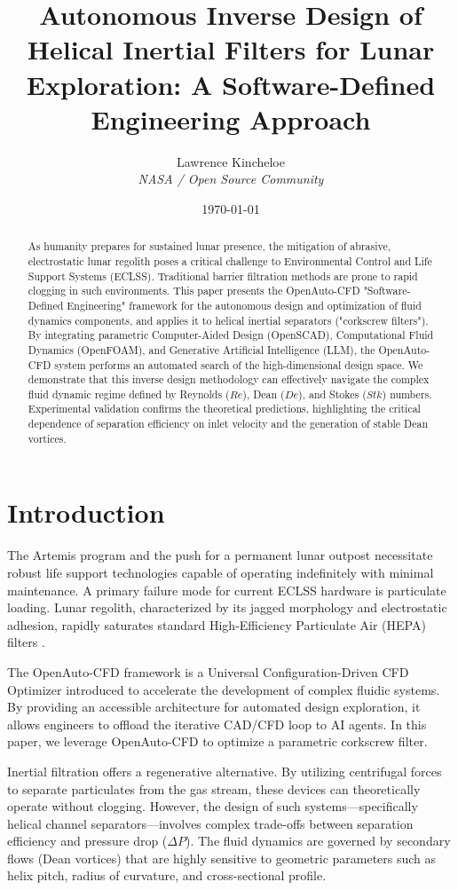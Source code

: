 \documentclass[twocolumn]{article}
\title{Autonomous Inverse Design of Helical Inertial Filters for Lunar Exploration: A Software-Defined Engineering Approach}
\author{Lawrence Kincheloe \\ \textit{NASA / Open Source Community}}
\date{\today}
\begin{document}
\maketitle

\begin{abstract}
As humanity prepares for sustained lunar presence, the mitigation of abrasive, electrostatic lunar regolith poses a critical challenge to Environmental Control and Life Support Systems (ECLSS). Traditional barrier filtration methods are prone to rapid clogging in such environments. This paper presents the OpenAuto-CFD "Software-Defined Engineering" framework for the autonomous design and optimization of fluid dynamics components, and applies it to helical inertial separators ("corkscrew filters"). By integrating parametric Computer-Aided Design (OpenSCAD), Computational Fluid Dynamics (OpenFOAM), and Generative Artificial Intelligence (LLM), the OpenAuto-CFD system performs an automated search of the high-dimensional design space. We demonstrate that this inverse design methodology can effectively navigate the complex fluid dynamic regime defined by Reynolds ($Re$), Dean ($De$), and Stokes ($Stk$) numbers. Experimental validation confirms the theoretical predictions, highlighting the critical dependence of separation efficiency on inlet velocity and the generation of stable Dean vortices.
\end{abstract}

\section{Introduction}

The Artemis program and the push for a permanent lunar outpost necessitate robust life support technologies capable of operating indefinitely with minimal maintenance. A primary failure mode for current ECLSS hardware is particulate loading. Lunar regolith, characterized by its jagged morphology and electrostatic adhesion, rapidly saturates standard High-Efficiency Particulate Air (HEPA) filters \cite{ref1}.

The OpenAuto-CFD framework is a Universal Configuration-Driven CFD Optimizer introduced to accelerate the development of complex fluidic systems. By providing an accessible architecture for automated design exploration, it allows engineers to offload the iterative CAD/CFD loop to AI agents. In this paper, we leverage OpenAuto-CFD to optimize a parametric corkscrew filter.

Inertial filtration offers a regenerative alternative. By utilizing centrifugal forces to separate particulates from the gas stream, these devices can theoretically operate without clogging. However, the design of such systems—specifically helical channel separators—involves complex trade-offs between separation efficiency and pressure drop ($\Delta P$). The fluid dynamics are governed by secondary flows (Dean vortices) that are highly sensitive to geometric parameters such as helix pitch, radius of curvature, and cross-sectional profile.
\end{document}
